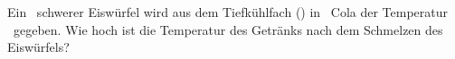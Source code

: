 Ein \mEO\ schwerer Eiswürfel wird aus dem Tiefkühlfach (\TEO) in \VCO\ Cola der Temperatur \TCO\ gegeben. Wie hoch ist die Temperatur des Getränks nach dem Schmelzen des Eiswürfels?
